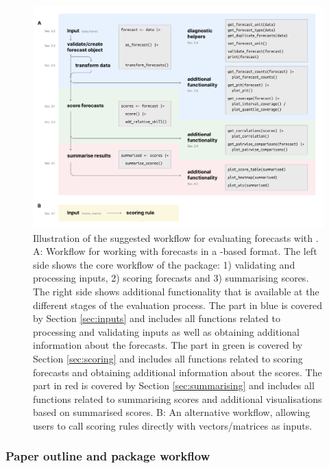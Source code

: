 \documentclass[
]{jss}
\begin{document}
\begin{CodeChunk}
\begin{figure}[!h]

{\centering \includegraphics[width=1\linewidth]{output/workflow} 

}

\caption{Illustration of the suggested workflow for evaluating forecasts with . A: Workflow for working with forecasts in a -based format. The left side shows the core workflow of the package: 1) validating and processing inputs, 2) scoring forecasts and 3) summarising scores. The right side shows additional functionality that is available at the different stages of the evaluation process. The part in blue is covered by Section \ref{sec:inputs} and includes all functions related to processing and validating inputs as well as obtaining additional information about the forecasts. The part in green is covered by Section \ref{sec:scoring} and includes all functions related to scoring forecasts and obtaining additional information about the scores. The part in red is covered by Section \ref{sec:summarising} and includes all functions related to summarising scores and additional visualisations based on summarised scores. B: An alternative workflow, allowing users to call scoring rules directly with vectors/matrices as inputs.}\label{fig:workflow-scoringutils}
\end{figure}
\end{CodeChunk}

\subsubsection{Paper outline and package
workflow}\label{paper-outline-and-package-workflow}
\end{document}
